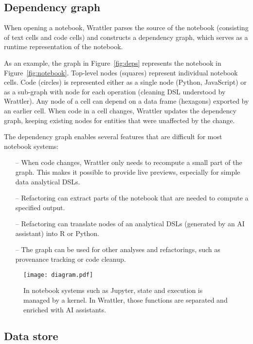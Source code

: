 \documentclass[sigplan,preprint,10pt]{acmart}\settopmatter{printfolios=true,printccs=false,printacmref=false}
\begin{document}
\subsection{Dependency graph}

When opening a notebook, Wrattler parses the source of the notebook (consisting of text cells and
code cells) and constructs a dependency graph, which serves as a runtime representation of the
notebook.

As an example, the graph in Figure~\ref{fig:deps} represents the notebook in Figure~\ref{fig:notebook}.
Top-level nodes (squares) represent individual notebook cells. Code (circles) is represented either as
a single node (Python, JavaScript) or as a sub-graph with node for each operation (cleaning DSL
understood by Wrattler). Any node of a cell can depend on a data frame (hexagons) exported by an
earlier cell. When code in a cell changes, Wrattler updates the dependency graph, keeping existing
nodes for entities that were unaffected by the change.

The dependency graph enables several features that are difficult for most notebook systems:
%
\begin{itemize}
\item[--] When code changes, Wrattler only needs to recompute a small part of the graph.
  This makes it possible to provide live previews, especially for simple data analytical DSLs.
\vspace{-0.85em}
\item[--] Refactoring can extract parts of the notebook that
  are needed to compute a specified output.
\vspace{0.25em}
\item[--] Refactoring can translate nodes of an analytical DSLs (generated by an AI assistant) into R or Python.
\vspace{0.25em}
\item[--] The graph can be used for other analyses and refactorings, such as provenance tracking
  or code cleanup.
\end{itemize}

\begin{figure}
\texttt{[image: diagram.pdf]}
\caption{\small{In notebook systems such as Jupyter, state and execution is managed by a kernel. In
  Wrattler, those functions are separated and enriched with AI assistants.}}
\label{fig:arch}
\end{figure}


\subsection{Data store}
\label{sec:wrattler-ds}
\end{document}
